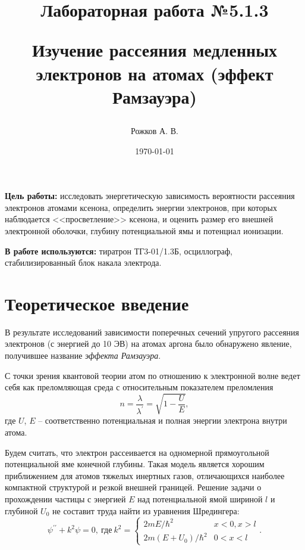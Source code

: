 \documentclass[a4paper, 12pt]{article}
\title{\begin{center}Лабораторная работа №5.1.3\end{center}
Изучение рассеяния медленных электронов на атомах (эффект Рамзауэра)}
\author{Рожков А. В.}
\date{\today}
\begin{document}
    \maketitle
    \newpage
    \renewcommand*{\thesubsection}{\thesection.\Alph{subsection}}


    \textbf{Цель работы:} исследовать энергетическую зависимость вероятности рассеяния электронов атомами ксенона, определить энергии электронов, при которых наблюдается <<просветление>> ксенона, и оценить размер его внешней электронной оболочки, глубину потенциальной ямы и потенциал ионизации.

    \textbf{В работе используются:} тиратрон ТГ3-01/1.3Б, осциллограф, стабилизированный блок накала электрода.

    \section{Теоретическое введение}

        В результате исследований зависимости поперечных сечений упругого рассеяния электронов (с энергией до 10 ЭВ) на атомах аргона было обнаружено явление, получившее название \textit{эффекта Рамзауэра}.

        С точки зрения квантовой теории атом по отношению к электронной волне ведет себя как преломляющая среда с относительным показателем преломления
        	\begin{equation}
        		n = \frac{\lambda}{\lambda^\prime} = \sqrt{1-\frac{U}{E}},
        	\end{equation}
        где $U$, $E$ -- соответственно потенциальная и полная энергии электрона внутри атома.

        Будем считать, что электрон рассеивается на одномерной прямоугольной потенциальной яме конечной глубины.
        Такая модель является хорошим приближением для атомов тяжелых инертных газов, отличающихся наиболее компактной структурой и резкой внешней границей.
        Решение задачи о прохождении частицы с энергией $E$ над потенциальной ямой шириной $l$ и глубиной $U_0$ не составит труда найти из уравнения Шредингера:\\
        	\begin{equation}
        		\psi^{\prime\prime}+k^2\psi=0, \ \text{где}\
        		k^2 =\begin{cases}
        			2mE/\hbar^2 & x<0, x>l\\
        			2m(E+U_0)/\hbar^2 & 0<x<l
        		\end{cases}.
        	\end{equation}
\end{document}
